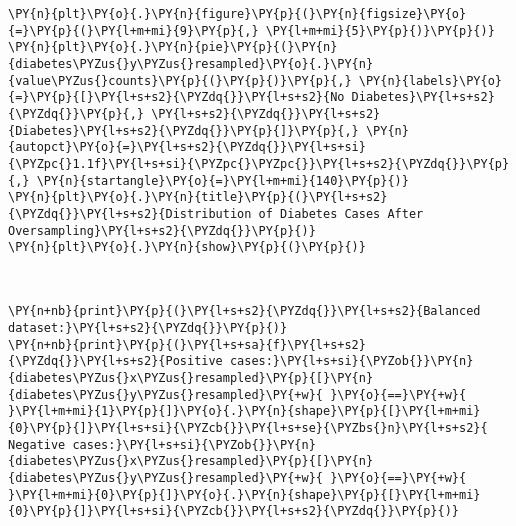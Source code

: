     \begin{tcolorbox}[breakable, size=fbox, boxrule=1pt, pad at break*=1mm,colback=cellbackground, colframe=cellborder]
\begin{Verbatim}[commandchars=\\\{\}]
\PY{n}{plt}\PY{o}{.}\PY{n}{figure}\PY{p}{(}\PY{n}{figsize}\PY{o}{=}\PY{p}{(}\PY{l+m+mi}{9}\PY{p}{,} \PY{l+m+mi}{5}\PY{p}{)}\PY{p}{)}
\PY{n}{plt}\PY{o}{.}\PY{n}{pie}\PY{p}{(}\PY{n}{diabetes\PYZus{}y\PYZus{}resampled}\PY{o}{.}\PY{n}{value\PYZus{}counts}\PY{p}{(}\PY{p}{)}\PY{p}{,} \PY{n}{labels}\PY{o}{=}\PY{p}{[}\PY{l+s+s2}{\PYZdq{}}\PY{l+s+s2}{No Diabetes}\PY{l+s+s2}{\PYZdq{}}\PY{p}{,} \PY{l+s+s2}{\PYZdq{}}\PY{l+s+s2}{Diabetes}\PY{l+s+s2}{\PYZdq{}}\PY{p}{]}\PY{p}{,} \PY{n}{autopct}\PY{o}{=}\PY{l+s+s2}{\PYZdq{}}\PY{l+s+si}{\PYZpc{}1.1f}\PY{l+s+si}{\PYZpc{}\PYZpc{}}\PY{l+s+s2}{\PYZdq{}}\PY{p}{,} \PY{n}{startangle}\PY{o}{=}\PY{l+m+mi}{140}\PY{p}{)}
\PY{n}{plt}\PY{o}{.}\PY{n}{title}\PY{p}{(}\PY{l+s+s2}{\PYZdq{}}\PY{l+s+s2}{Distribution of Diabetes Cases After Oversampling}\PY{l+s+s2}{\PYZdq{}}\PY{p}{)}
\PY{n}{plt}\PY{o}{.}\PY{n}{show}\PY{p}{(}\PY{p}{)}
\end{Verbatim}
\end{tcolorbox}

    \begin{center}
    \end{center}
    { \hspace*{\fill} \\}
    
    \begin{tcolorbox}[breakable, size=fbox, boxrule=1pt, pad at break*=1mm,colback=cellbackground, colframe=cellborder]
\begin{Verbatim}[commandchars=\\\{\}]
\PY{n+nb}{print}\PY{p}{(}\PY{l+s+s2}{\PYZdq{}}\PY{l+s+s2}{Balanced dataset:}\PY{l+s+s2}{\PYZdq{}}\PY{p}{)}
\PY{n+nb}{print}\PY{p}{(}\PY{l+s+sa}{f}\PY{l+s+s2}{\PYZdq{}}\PY{l+s+s2}{Positive cases:}\PY{l+s+si}{\PYZob{}}\PY{n}{diabetes\PYZus{}x\PYZus{}resampled}\PY{p}{[}\PY{n}{diabetes\PYZus{}y\PYZus{}resampled}\PY{+w}{ }\PY{o}{==}\PY{+w}{ }\PY{l+m+mi}{1}\PY{p}{]}\PY{o}{.}\PY{n}{shape}\PY{p}{[}\PY{l+m+mi}{0}\PY{p}{]}\PY{l+s+si}{\PYZcb{}}\PY{l+s+se}{\PYZbs{}n}\PY{l+s+s2}{ Negative cases:}\PY{l+s+si}{\PYZob{}}\PY{n}{diabetes\PYZus{}x\PYZus{}resampled}\PY{p}{[}\PY{n}{diabetes\PYZus{}y\PYZus{}resampled}\PY{+w}{ }\PY{o}{==}\PY{+w}{ }\PY{l+m+mi}{0}\PY{p}{]}\PY{o}{.}\PY{n}{shape}\PY{p}{[}\PY{l+m+mi}{0}\PY{p}{]}\PY{l+s+si}{\PYZcb{}}\PY{l+s+s2}{\PYZdq{}}\PY{p}{)}
\end{Verbatim}
\end{tcolorbox}

